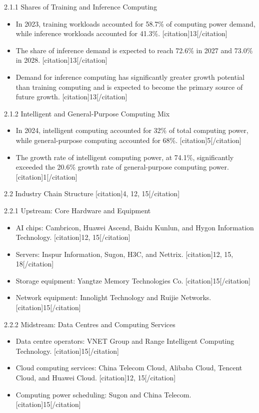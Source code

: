 \documentclass{huawei}
\begin{document}
\begin{tcolorbox}[
    title={Example of Hierarchical Research Outline},
    colback=gray!5,
    colframe=gray!40,
    fonttitle=\bfseries,
    boxrule=0.5pt,
    arc=2pt,
    breakable
]
\textcolor{TitleRed}{2.1.1 Shares of Training and Inference Computing}
\begin{itemize}[leftmargin=1em, listparindent=\parindent]
\item In 2023, training workloads accounted for 58.7\% of computing power demand, while inference workloads accounted for 41.3\%. [citation]13[/citation]
\item The share of inference demand is expected to reach 72.6\% in 2027 and 73.0\% in 2028. [citation]13[/citation]
\item Demand for inference computing has significantly greater growth potential than training computing and is expected to become the primary source of future growth. [citation]13[/citation]
\end{itemize}

\textcolor{TitleRed}{2.1.2 Intelligent and General-Purpose Computing Mix}
\begin{itemize}[leftmargin=1em, listparindent=\parindent]
\item In 2024, intelligent computing accounted for 32\% of total computing power, while general-purpose computing accounted for 68\%. [citation]5[/citation]
\item The growth rate of intelligent computing power, at 74.1\%, significantly exceeded the 20.6\% growth rate of general-purpose computing power. [citation]1[/citation]
\end{itemize}

\textcolor{TitleRed}{2.2 Industry Chain Structure [citation]4, 12, 15[/citation]}

\textcolor{TitleRed}{2.2.1 Upstream: Core Hardware and Equipment}
\begin{itemize}[leftmargin=1em, listparindent=\parindent]
\item AI chips: Cambricon, Huawei Ascend, Baidu Kunlun, and Hygon Information Technology. [citation]12, 15[/citation]
\item Servers: Inspur Information, Sugon, H3C, and Nettrix. [citation]12, 15, 18[/citation]
\item Storage equipment: Yangtze Memory Technologies Co. [citation]15[/citation]
\item Network equipment: Innolight Technology and Ruijie Networks. [citation]15[/citation]
\end{itemize}

\textcolor{TitleRed}{2.2.2 Midstream: Data Centres and Computing Services}
\begin{itemize}[leftmargin=1em, listparindent=\parindent]
\item Data centre operators: VNET Group and Range Intelligent Computing Technology. [citation]15[/citation]
\item Cloud computing services: China Telecom Cloud, Alibaba Cloud, Tencent Cloud, and Huawei Cloud. [citation]12, 15[/citation]
\item Computing power scheduling: Sugon and China Telecom. [citation]15[/citation]
\end{itemize}


\end{tcolorbox}
\end{document}
